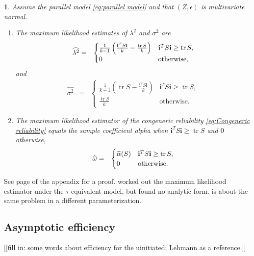 \documentclass{article}
\makeatletter
\theoremstyle{plain}
\newtheorem{thm}{\protect\theoremname}
\theoremstyle{plain}
\theoremstyle{definition}
\theoremstyle{remark}
\theoremstyle{definition}
\theoremstyle{plain}
\theoremstyle{plain}
\theoremstyle{definition}
\newenvironment{proof}[1][\protect\proofname]{\par
	\normalfont\topsep6\p@\@plus6\p@\relax
	\trivlist
	\itemindent\parindent
	\item[\hskip\labelsep\scshape #1]\ignorespaces
}{%
	\endtrivlist\@endpefalse
}
\providecommand{\proofname}{Proof}
\providecommand{\theoremname}{Theorem}
\DeclareMathOperator{\tr}{tr}
\makeatother
\begin{document}
\begin{thm}\label{thm:ML}
Assume the parallel model \eqref{eq:parallel model} and that $(Z,\epsilon)$ is multivariate normal. 
\begin{enumerate}[label=(\roman*)]
\item The maximum likelihood estimates of $\lambda^{2}$
and $\sigma^{2}$ are 
\begin{eqnarray*}
\widehat{\lambda^{2}} & = & \begin{cases}
\frac{1}{k-1}\left(\frac{\mathbf{i}^{T}S\mathbf{i}}{k}-\frac{\tr{S}}{k}\right) & \mathbf{i}^{T}S\mathbf{i}\geq\tr{S},\\
0 & \text{\textrm{otherwise}},
\end{cases}\\
\end{eqnarray*}
and
\begin{eqnarray*}
\widehat{\sigma^{2}} & = & \begin{cases}
\frac{1}{k-1}\left(\tr{S}-\frac{\mathbf{i}^{T}S\mathbf{i}}{k}\right) & \mathbf{i}^{T}S\mathbf{i}\geq\tr{S},\\
\frac{\tr{S}}{k} & \textrm{otherwise}.
\end{cases}
\end{eqnarray*}
\item The maximum likelihood estimator of the congeneric reliability
\eqref{eq:Congeneric reliability} equals the sample coefficient alpha
when $\mathbf{i}^{T}S\mathbf{i}\geq\tr{S}$ and $0$ otherwise,
\begin{eqnarray*}
\widehat{\omega} & = & \begin{cases}
\widehat{\alpha}(S) & \mathbf{i}^{T}S\mathbf{i}\geq\tr{S},\\
0 & \text{\textrm{otherwise}}.
\end{cases}
\end{eqnarray*}
\end{enumerate}
\end{thm}
\begin{proof}
See page \pageref{proof:ML} of the appendix for a proof. \citet[][section 3 -- 5]{Kristof1969-ou} worked out the maximum likelihood estimator under the $\tau$-equivalent model, but found no analytic form. \citep[][Exercise 3.9, p. 114]{Muirhead2009-kq} is about the same problem in a different parameterization.
\end{proof}

\subsection{Asymptotic efficiency}
[[fill in: some words about efficiency for the uinitiated; Lehmann as a reference.]]
\end{document}
